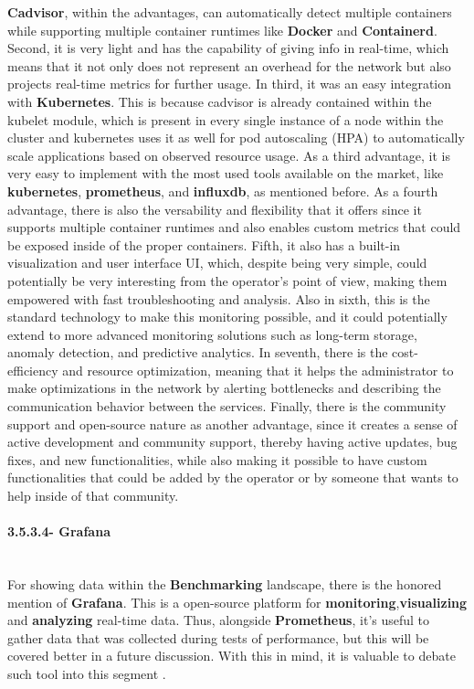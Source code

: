 \textbf{Cadvisor}, within the advantages, can automatically detect multiple containers while supporting multiple container runtimes like \textbf{Docker} and \textbf{Containerd}. Second, it is very light and has the capability of giving info in real-time, which means that it not only does not represent an overhead for the network but also projects real-time metrics for further usage. In third, it was an easy integration with \textbf{Kubernetes}. This is because cadvisor is already contained within the kubelet module, which is present in every single instance of a node within the cluster and kubernetes uses it as well for pod autoscaling (HPA) to automatically scale applications based on observed resource usage. As a third advantage, it is very easy to implement with the most used tools available on the market, like \textbf{kubernetes}, \textbf{prometheus}, and \textbf{influxdb}, as mentioned before. As a fourth advantage, there is also the versability and flexibility that it offers since it supports multiple container runtimes and also enables custom metrics that could be exposed inside of the proper containers. Fifth, it also has a built-in visualization and user interface UI, which, despite being very simple, could potentially be very interesting from the operator's point of view, making them empowered with fast troubleshooting and analysis. Also in sixth, this is the standard technology to make this monitoring possible, and it could potentially extend to more advanced monitoring solutions such as long-term storage, anomaly detection, and predictive analytics. In seventh, there is the cost-efficiency and resource optimization, meaning that it helps the administrator to make optimizations in the network by alerting bottlenecks and describing the communication behavior between the services. Finally, there is the community support and open-source nature as another advantage, since it creates a sense of active development and community support, thereby having active updates, bug fixes, and new functionalities, while also making it possible to have custom functionalities that could be added by the operator or by someone that wants to help inside of that community.


\paragraph{3.5.3.4- Grafana}\mbox{}\\
For showing data within the \textbf{Benchmarking} landscape, there is the honored mention of \textbf{Grafana}. This is a open-source platform for \textbf{monitoring},\textbf{visualizing} and \textbf{analyzing} real-time data. Thus, alongside \textbf{Prometheus}, it's useful to gather data that was collected during tests of performance, but this will be covered better in a future discussion. With this in mind, it is valuable to debate such tool into this segment \cite{grafana}.

